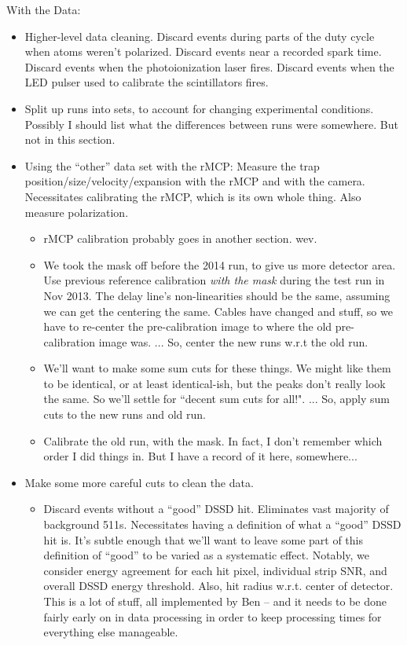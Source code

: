 With the Data:
\begin{itemize}
	\item Higher-level data cleaning.  Discard events during parts of the duty cycle when atoms weren't polarized.  Discard events near a recorded spark time.  Discard events when the photoionization laser fires.  Discard events when the LED pulser used to calibrate the scintillators fires.  
	\item Split up runs into sets, to account for changing experimental conditions.  Possibly I should list what the differences between runs were somewhere.  But not in this section.
	\item Using the ``other'' data set with the rMCP:  Measure the trap position/size/velocity/expansion with the rMCP and with the camera.  Necessitates calibrating the rMCP, which is its own whole thing.  Also measure polarization.
		\begin{itemize}
		\item rMCP calibration probably goes in another section.  wev.
		\item We took the mask off before the 2014 run, to give us more detector area.  Use previous reference calibration \emph{with the mask} during the test run in Nov 2013.  The delay line's non-linearities should be the same, assuming we can get the centering the same.  Cables have changed and stuff, so we have to re-center the pre-calibration image to where the old pre-calibration image was.  ...  So, center the new runs w.r.t the old run.
		\item We'll want to make some sum cuts for these things.  We might like them to be identical, or at least identical-ish, but the peaks don't really look the same.  So we'll settle for ``decent sum cuts for all!".  ...  So, apply sum cuts to the new runs and old run.
		\item Calibrate the old run, with the mask.  In fact, I don't remember which order I did things in.  But I have a record of it here, somewhere...
		\end{itemize}
	\item Make some more careful cuts to clean the data.  
		\begin{itemize}
		\item Discard events without a ``good'' DSSD hit.  Eliminates vast majority of background 511s.  Necessitates having a definition of what a ``good'' DSSD hit is.  It's subtle enough that we'll want to leave some part of this definition of ``good'' to be varied as a systematic effect.  Notably, we consider energy agreement for each hit pixel, individual strip SNR, and overall DSSD energy threshold.  Also, hit radius w.r.t. center of detector.  This is a lot of stuff, all implemented by Ben -- and it needs to be done fairly early on in data processing in order to keep processing times for everything else manageable.  

\end{itemize}
\end{itemize}
